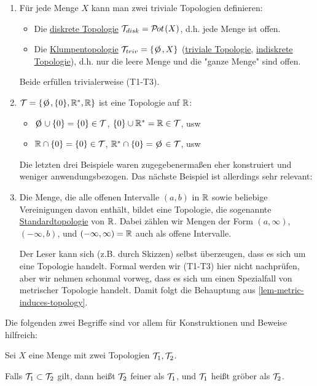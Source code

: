 \begin{example}
    \begin{enumerate}
        \item Für jede Menge $X$ kann man zwei triviale Topologien definieren:
        \begin{itemize}
            \item Die \underline{diskrete Topologie} $\mathcal{T}_{disk} = \mathcal{P}\hspace{-1pt}ot\hspace{1pt}(X)$, d.h. jede Menge ist offen.
            \item Die \underline{Klumpentopologie} $\T_{triv} = \{\e, X\}$ (\underline{triviale Topologie}, \underline{indiskrete Topologie}), d.h. nur die leere Menge und die "ganze Menge" sind offen.
        \end{itemize}
        Beide erfüllen trivialerweise (T1-T3).
        \item $\T = \{\e, \{0\}, \R^*, \R\}$ ist eine Topologie auf $\mathbb{R}$:
        \begin{itemize}%
            \item $\e \cup \{0\} = \{0\} \in \T$, \quad $\{0\} \cup \mathbb{R}^* = \mathbb{R} \in \mathcal{T}$, \quad usw
            \item $\mathbb{R} \cap \{0\} = \{0\} \in \mathcal{T}$, \quad $\R^* \cap \{0\} = \e \in \T$, \quad usw
        \end{itemize}
        Die letzten drei Beispiele waren zugegebenermaßen eher konstruiert und weniger anwendungsbezogen. Das nächste Beispiel ist allerdings sehr relevant:
        \item Die Menge, die alle offenen Intervalle $(a,b)$ in $\mathbb{R}$ sowie beliebige Vereinigungen davon enthält, bildet eine Topologie, die sogenannte \underline{Standardtopologie} von $\mathbb{R}$. Dabei zählen wir Mengen der Form $(a, \infty)$, $(-\infty, b)$, und $(- \infty, \infty) = \mathbb{R}$ auch als offene Intervalle.
        
        Der Leser kann sich (z.B. durch Skizzen) selbst überzeugen, dass es sich um eine Topologie handelt. Formal werden wir (T1-T3) hier nicht nachprüfen, aber wir nehmen schonmal vorweg, dass es sich um einen Spezialfall von metrischer Topologie handelt. Damit folgt die Behauptung aus \ref{lem-metric-induces-topology}.
    \end{enumerate}
\end{example}

Die folgenden zwei Begriffe sind vor allem für Konstruktionen und Beweise hilfreich:

\begin{definition}
    Sei $X$ eine Menge mit zwei Topologien $\mathcal{T}_1, \mathcal{T}_2$.

    Falls $\mathcal{T}_1 \subset \mathcal{T}_2$ gilt, dann heißt $\mathcal{T}_2$ feiner als $\mathcal{T}_1$, und $\mathcal{T}_1$ heißt gröber als $\mathcal{T}_2$.
\end{definition}

